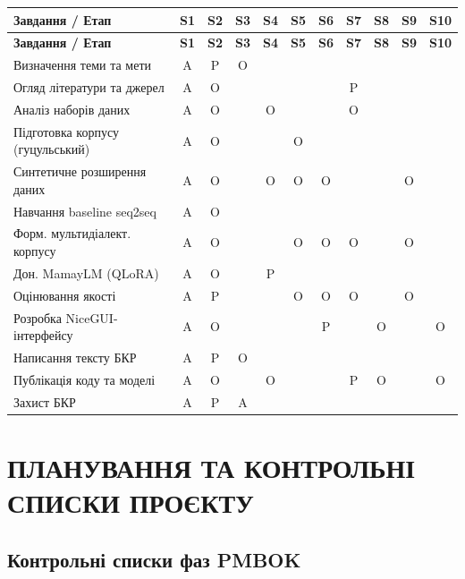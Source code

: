 \documentclass[14pt]{extarticle}
\newcommand{\tabhead}[1]{\textbf{#1}}
\begin{document}
\begin{center}
\begin{longtable}{|p{}|c|c|c|c|c|c|c|c|c|c|}
\hline
\tabhead{Завдання / Етап} & \tabhead{S1} & \tabhead{S2} & \tabhead{S3} & \tabhead{S4} & \tabhead{S5} & \tabhead{S6} & \tabhead{S7} & \tabhead{S8} & \tabhead{S9} & \tabhead{S10} \\
\hline
\endfirsthead
\hline
\tabhead{Завдання / Етап} & \tabhead{S1} & \tabhead{S2} & \tabhead{S3} & \tabhead{S4} & \tabhead{S5} & \tabhead{S6} & \tabhead{S7} & \tabhead{S8} & \tabhead{S9} & \tabhead{S10} \\
\hline
\endhead
Визначення теми та мети & A & P & O & & & & & & & \\
\hline
Огляд літератури та джерел & A & O & & & & & P & & & \\
\hline
Аналіз наборів даних & A & O & & O & & & O & & & \\
\hline
Підготовка корпусу (гуцульський) & A & O & & & O & & & & & \\
\hline
Синтетичне розширення даних & A & O & & O & O & O & & & O & \\
\hline
Навчання baseline seq2seq & A & O & & & & & & & & \\
\hline
Форм. мульти\-діалект. корпусу & A & O & & & O & O & O & & O & \\
\hline
Дон. MamayLM (QLoRA) & A & O & & P & & & & & & \\
\hline
Оцінювання якості & A & P & & & O & O & O & & O & \\
\hline
Розробка NiceGUI-інтерфейсу & A & O & & & & P & & O & & O \\
\hline
Написання тексту БКР & A & P & O & & & & & & & \\
\hline
Публікація коду та моделі & A & O & & O & & & P & O & & O \\
\hline
Захист БКР & A & P & A & & & & & & & \\
\hline
\end{longtable}
\end{center}

\clearpage

\section{ПЛАНУВАННЯ ТА КОНТРОЛЬНІ СПИСКИ ПРОЄКТУ}

\subsection{Контрольні списки фаз PMBOK}
\end{document}
